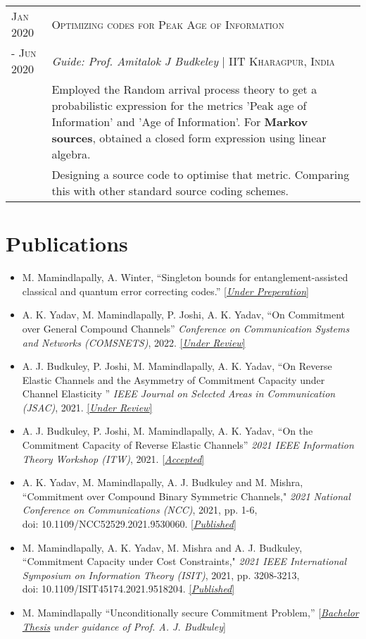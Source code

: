 \documentclass[a4paper,10pt]{article}
\def \siteurl{https://manideepmamindlapally.ninja}
\begin{document}
\begin{tabular}{p{1.8cm}|p{15.3cm}}
\centering  \textsc{Jan 2020} & \textsc{Optimizing codes for Peak Age of Information}
  \\ \centering\textsc{- Jun 2020}&\emph{Guide: Prof. Amitalok J Budkeley} | \small{\textsc{IIT Kharagpur, India}}\\ &\footnotesize{ Employed the Random arrival process theory to get a probabilistic expression for the metrics 'Peak age of Information' and 'Age of Information'. For \textbf{Markov sources}, obtained a closed form expression using linear algebra.}\\
  &  \footnotesize{Designing a source code to optimise that metric. Comparing this with other standard source coding schemes.}
\end{tabular}

\section{Publications}
\begin{itemize}
\item M. Mamindlapally, A. Winter, ``Singleton bounds for entanglement-assisted classical and quantum error correcting codes.'' \href{\siteurl /assests/files/cv/cv.pdf}{\small{[\textit{Under Preperation}]}}
\item A. K. Yadav, M. Mamindlapally, P. Joshi, A. K. Yadav, ``On Commitment over General Compound Channels'' \textit{Conference on Communication Systems and Networks (COMSNETS)}, 2022. \href{https://www.comsnets.org/}{\small{[\textit{Under Review}]}}
\item A. J. Budkuley, P. Joshi, M. Mamindlapally, A. K. Yadav, ``On Reverse Elastic Channels and the Asymmetry of Commitment Capacity under Channel Elasticity
'' \textit{IEEE Journal on Selected Areas in Communication (JSAC)}, 2021. \href{https://www.comsoc.org/publications/journals/ieee-jsac}{\small{[\textit{Under Review}]}}
\item A. J. Budkuley, P. Joshi, M. Mamindlapally, A. K. Yadav, ``On the Commitment Capacity of Reverse Elastic Channels'' \textit{2021 IEEE Information Theory Workshop (ITW)}, 2021. \href{https://www.itsoc.org/event/itw-2021-kanazawa}{\small{[\textit{Accepted}]}}
\item A. K. Yadav, M. Mamindlapally, A. J. Budkuley and M. Mishra, ``Commitment over Compound Binary Symmetric Channels," \textit{2021 National Conference on Communications (NCC)}, 2021, pp. 1-6, \\ doi: 10.1109/NCC52529.2021.9530060. \href{https://doi.org/10.1109/NCC52529.2021.9530060}{\small{[\textit{Published}]}}
\item M. Mamindlapally, A. K. Yadav, M. Mishra and A. J. Budkuley, ``Commitment Capacity under Cost Constraints," \textit{2021 IEEE International Symposium on Information Theory (ISIT)}, 2021, pp. 3208-3213, \\ doi: 10.1109/ISIT45174.2021.9518204. \href{https://doi.org/10.1109/ISIT45174.2021.9518204}{\small{[\textit{Published}]}}
\item M. Mamindlapally ``Unconditionally secure Commitment Problem,'' [\href{\siteurl /assests/files/cv/cv.pdf}{\textit{Bachelor Thesis}}\textit{ under guidance of Prof. A. J. Budkuley}]
\end{itemize}
\end{document}
